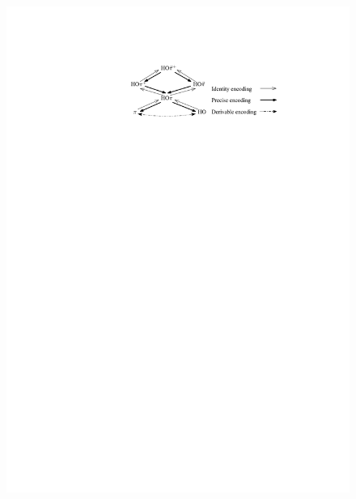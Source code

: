 \begin{figure}[t]
\centering
\includegraphics[scale=1]{diag.pdf}
\vspace{1mm}
%
%
%
%

\end{figure}
